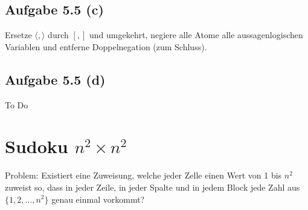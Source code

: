 \documentclass[12pt,a4paper]{article}
\begin{document}
\subsection*{Aufgabe 5.5 (c)}
Ersetze $\langle,\rangle$ durch $[,]$ und umgekehrt, negiere alle Atome alle aussagenlogischen Variablen und entferne Doppelnegation (zum Schluss).

\subsection*{Aufgabe 5.5 (d)}
To Do %

\section*{Sudoku $n^2\times n^2$}
Problem: Existiert eine Zuweisung, welche jeder Zelle einen Wert von 1 bis $n^2$ zuweist so, dass in jeder Zeile, in jeder  Spalte und in jedem Block jede Zahl aus $\lbrace1,2,\ldots,n^2\rbrace$ genau einmal vorkommt?
\end{document}

